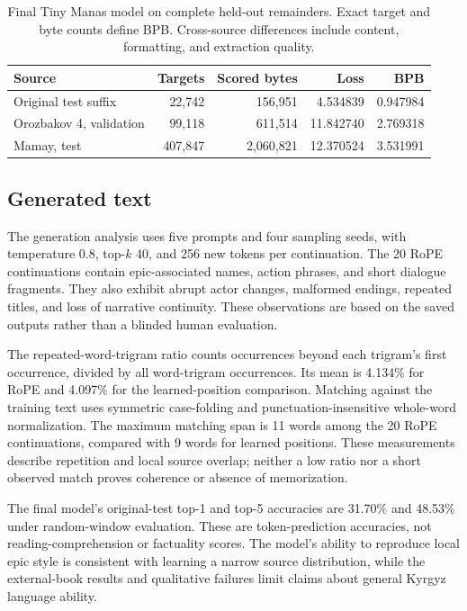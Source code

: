 \documentclass{article}
\begin{document}
\begin{table}[ht]
\caption{Final Tiny Manas model on complete held-out remainders. Exact target and byte counts define BPB. Cross-source differences include content, formatting, and extraction quality.}
\label{tab:transfer}\centering\small
\begin{tabular}{lrrrr}
\toprule Source & Targets & Scored bytes & Loss & BPB \\
\midrule
Original test suffix & 22,742 & 156,951 & 4.534839 & 0.947984 \\
Orozbakov 4, validation & 99,118 & 611,514 & 11.842740 & 2.769318 \\
Mamay, test & 407,847 & 2,060,821 & 12.370524 & 3.531991 \\
\bottomrule
\end{tabular}
\end{table}

\subsection{Generated text}
\label{sec:generation}
The generation analysis uses five prompts and four sampling seeds, with temperature 0.8, top-$k$ 40, and 256 new tokens per continuation. The 20 RoPE continuations contain epic-associated names, action phrases, and short dialogue fragments. They also exhibit abrupt actor changes, malformed endings, repeated titles, and loss of narrative continuity. These observations are based on the saved outputs rather than a blinded human evaluation.

The repeated-word-trigram ratio counts occurrences beyond each trigram's first occurrence, divided by all word-trigram occurrences. Its mean is 4.134\% for RoPE and 4.097\% for the learned-position comparison. Matching against the training text uses symmetric case-folding and punctuation-insensitive whole-word normalization. The maximum matching span is 11 words among the 20 RoPE continuations, compared with 9 words for learned positions. These measurements describe repetition and local source overlap; neither a low ratio nor a short observed match proves coherence or absence of memorization.

The final model's original-test top-1 and top-5 accuracies are 31.70\% and 48.53\% under random-window evaluation. These are token-prediction accuracies, not reading-comprehension or factuality scores. The model's ability to reproduce local epic style is consistent with learning a narrow source distribution, while the external-book results and qualitative failures limit claims about general Kyrgyz language ability.
\end{document}
